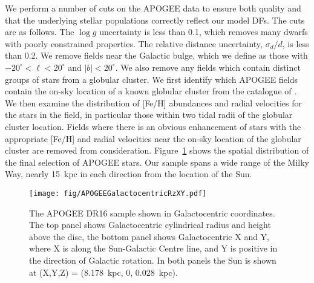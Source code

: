 We perform a number of cuts on the APOGEE data to ensure both quality and that the underlying stellar populations correctly reflect our model DFs. The cuts are as follows. The $\log g$ uncertainty is less than 0.1, which removes many dwarfs with poorly constrained properties. The relative distance uncertainty, $\sigma_{d}/d$, is less than 0.2. We remove fields near the Galactic bulge, which we define as those with $-20^{\circ} < \ell < 20^{\circ}$ and $|b| < 20^{\circ}$. We also remove any fields which contain distinct groups of stars from a globular cluster. We first identify which APOGEE fields contain the on-sky location of a known globular cluster from the catalogue of \citet[][ The December 2010 version]{harris96}. We then examine the distribution of [Fe/H] abundances and radial velocities for the stars in the field, in particular those within two tidal radii of the globular cluster location. Fields where there is an obvious enhancement of stars with the appropriate [Fe/H] and radial velocities near the on-sky location of the globular cluster are removed from consideration. Figure~\ref{fig:APOGEELocations} shows the spatial distribution of the final selection of APOGEE stars. Our sample spans a wide range of the Milky Way, nearly 15~kpc in each direction from the location of the Sun.

\begin{figure}
	\centering
	\texttt{[image: fig/APOGEEGalactocentricRzXY.pdf]}
	\caption{The APOGEE DR16 sample shown in Galactocentric coordinates. The top panel shows Galactocentric cylindrical radius and height above the disc, the bottom panel shows Galactocentric X and Y, where X is along the Sun-Galactic Centre line, and Y is positive in the direction of Galactic rotation. In both panels the Sun is shown at (X,Y,Z) = (8.178~kpc, 0, 0.028~kpc).}
	\label{fig:APOGEELocations}
\end{figure}

